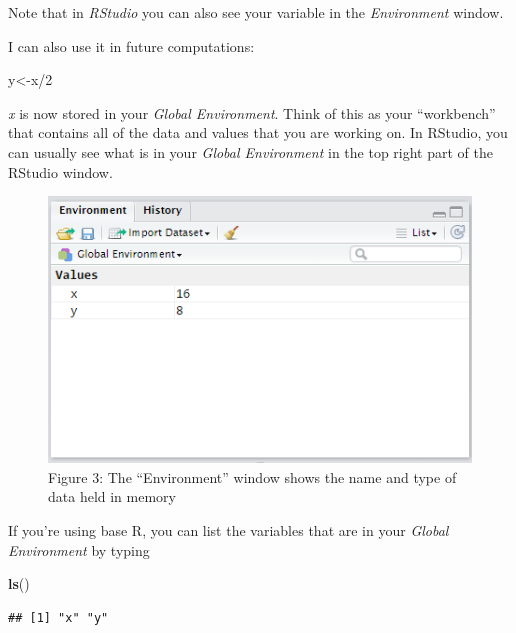 \documentclass[]{book}
\newenvironment{Shaded}{\begin{snugshade}}{\end{snugshade}}
\newcommand{\KeywordTok}[1]{\textcolor[rgb]{0.13,0.29,0.53}{\textbf{{#1}}}}
\newcommand{\DecValTok}[1]{\textcolor[rgb]{0.00,0.00,0.81}{{#1}}}
\newcommand{\NormalTok}[1]{{#1}}
\begin{document}
Note that in \emph{RStudio} you can also see your variable in the
\emph{Environment} window.

I can also use it in future computations:

\begin{Shaded}
\begin{Highlighting}[]
\NormalTok{y<-x/}\DecValTok{2}
\end{Highlighting}
\end{Shaded}

\emph{x} is now stored in your \emph{Global Environment}. Think of this
as your ``workbench'' that contains all of the data and values that you
are working on. In RStudio, you can usually see what is in your
\emph{Global Environment} in the top right part of the RStudio window.

\begin{figure}[htbp]
\centering
\includegraphics{environment.PNG}
\caption{Figure 3: The ``Environment'' window shows the name and type of
data held in memory}
\end{figure}

If you're using base R, you can list the variables that are in your
\emph{Global Environment} by typing

\begin{Shaded}
\begin{Highlighting}[]
\KeywordTok{ls}\NormalTok{()}
\end{Highlighting}
\end{Shaded}

\begin{verbatim}
## [1] "x" "y"
\end{verbatim}
\end{document}
